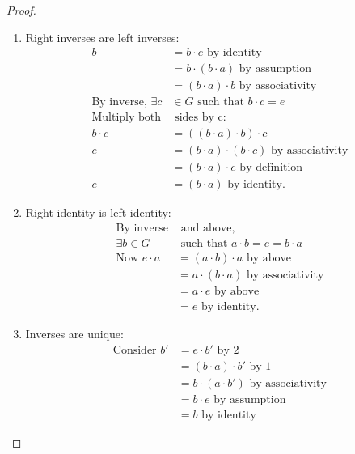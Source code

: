\documentclass[../Main.tex]{subfiles}
\begin{document}
\begin{proof}
    \begin{enumerate}
        \item Right inverses are left inverses:
        \begin{align*}
            b &= b \cdot e \text{ by identity}\\
            &= b \cdot (b \cdot a) \text{ by assumption}\\
            &= (b \cdot a) \cdot b \text{ by associativity}\\
            \text{By inverse, }\exists c &\in G \text{ such that } b \cdot c = e \\
            \text{Multiply both} & \text{ sides by c:} \\
            b \cdot c &= ((b \cdot a) \cdot b) \cdot c \\
            e &= (b \cdot a) \cdot (b \cdot c) \text{ by associativity} \\
            &= (b \cdot a) \cdot e \text{ by definition} \\
            e &= (b \cdot a) \text{ by identity.}
        \end{align*}       
        \item Right identity is left identity:
        \begin{align*}
            \text{By inverse} & \text{ and above,} \\
            \exists b \in G & \text{ such that } a \cdot b = e = b \cdot a \\
            \text{Now } e \cdot a &= (a \cdot b) \cdot a \text{ by above} \\
            &= a \cdot (b \cdot a) \text{ by associativity} \\
            &= a \cdot e \text{ by above} \\
            &= e \text{ by identity.}
        \end{align*}
        \item Inverses are unique:
        \begin{align*}
            \text{Consider } b' &= e \cdot b' \text{ by 2} \\
            &= (b \cdot a) \cdot b' \text{ by 1} \\
            &= b \cdot (a \cdot b') \text{ by associativity} \\
            &= b \cdot e \text{ by assumption} \\
            &= b \text{ by identity}
        \end{align*}

\end{enumerate}
\end{proof}
\end{document}
